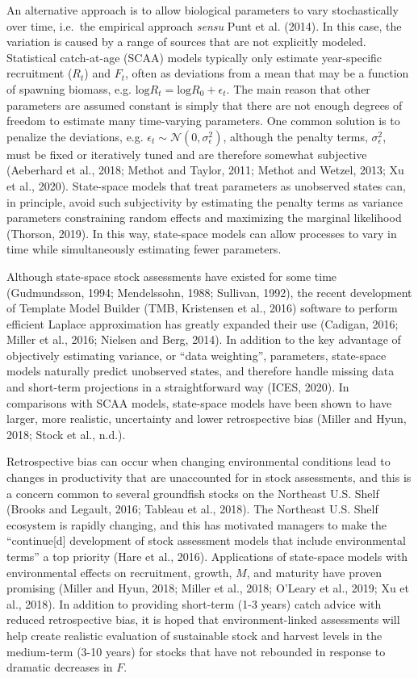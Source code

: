 \documentclass[]{article}
\begin{document}
An alternative approach is to allow biological parameters to vary
stochastically over time, i.e.~the empirical approach \emph{sensu} Punt
et al. (2014). In this case, the variation is caused by a range of
sources that are not explicitly modeled. Statistical catch-at-age (SCAA)
models typically only estimate year-specific recruitment (\(R_t\)) and
\(F_t\), often as deviations from a mean that may be a function of
spawning biomass, e.g. \(\text{log}R_t = \text{log}R_0 + \epsilon_t\).
The main reason that other parameters are assumed constant is simply
that there are not enough degrees of freedom to estimate many
time-varying parameters. One common solution is to penalize the
deviations, e.g. \(\epsilon_t \sim \mathcal{N}(0,\sigma^2_\epsilon)\),
although the penalty terms, \(\sigma^2_\epsilon\), must be fixed or
iteratively tuned and are therefore somewhat subjective (Aeberhard et
al., 2018; Methot and Taylor, 2011; Methot and Wetzel, 2013; Xu et al.,
2020). State-space models that treat parameters as unobserved states
can, in principle, avoid such subjectivity by estimating the penalty
terms as variance parameters constraining random effects and maximizing
the marginal likelihood (Thorson, 2019). In this way, state-space models
can allow processes to vary in time while simultaneously estimating
fewer parameters.

Although state-space stock assessments have existed for some time
(Gudmundsson, 1994; Mendelssohn, 1988; Sullivan, 1992), the recent
development of Template Model Builder (TMB, Kristensen et al., 2016)
software to perform efficient Laplace approximation has greatly expanded
their use (Cadigan, 2016; Miller et al., 2016; Nielsen and Berg, 2014).
In addition to the key advantage of objectively estimating variance, or
``data weighting'', parameters, state-space models naturally predict
unobserved states, and therefore handle missing data and short-term
projections in a straightforward way (ICES, 2020). In comparisons with
SCAA models, state-space models have been shown to have larger, more
realistic, uncertainty and lower retrospective bias (Miller and Hyun,
2018; Stock et al., n.d.).

Retrospective bias can occur when changing environmental conditions lead
to changes in productivity that are unaccounted for in stock
assessments, and this is a concern common to several groundfish stocks
on the Northeast U.S. Shelf (Brooks and Legault, 2016; Tableau et al.,
2018). The Northeast U.S. Shelf ecosystem is rapidly changing, and this
has motivated managers to make the ``continue{[}d{]} development of
stock assessment models that include environmental terms'' a top
priority (Hare et al., 2016). Applications of state-space models with
environmental effects on recruitment, growth, \(M\), and maturity have
proven promising (Miller and Hyun, 2018; Miller et al., 2018; O'Leary et
al., 2019; Xu et al., 2018). In addition to providing short-term (1-3
years) catch advice with reduced retrospective bias, it is hoped that
environment-linked assessments will help create realistic evaluation of
sustainable stock and harvest levels in the medium-term (3-10 years) for
stocks that have not rebounded in response to dramatic decreases in
\(F\).
\end{document}
